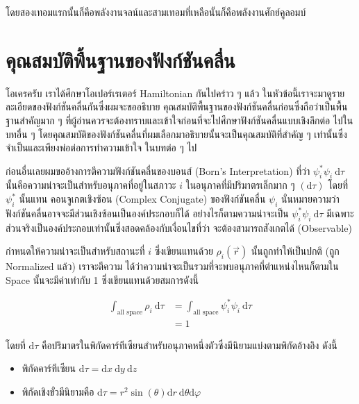 \noindent โดยสองเทอมแรกนั้นก็คือพลังงานจลน์และสามเทอมที่เหลือนั้นก็คือพลังงานศักย์คูลอมบ์

\section{คุณสมบัติพื้นฐานของฟังก์ชันคลื่น}

โอเครครับ เราได้ศึกษาโอเปอร์เรเตอร์ Hamiltonian กันไปคร่าว ๆ แล้ว ในหัวข้อนี้เราจะมาดูรายละเอียดของฟังก์ชันคลื่นกันซึ่งผมจะขออธิบาย%
คุณสมบัติพื้นฐานของฟังก์ชันคลื่นก่อนซึ่งถือว่าเป็นพื้นฐานสำคัญมาก ๆ ที่ผู้อ่านควรจะต้องทราบและเข้าใจก่อนที่จะไปศึกษาฟังก์ชันคลื่นแบบเชิงลึกต่อ%
ไปในบทอื่น ๆ โดยคุณสมบัติของฟังก์ชันคลื่นที่ผมเลือกมาอธิบายนั้นจะเป็นคุณสมบัติที่สำคัญ ๆ เท่านั้นซึ่งจำเป็นและเพียงพ่อต่อการทำความเข้าใจ%
ในบทต่อ ๆ ไป

ก่อนอื่นเลยผมขออ้างการตีความฟังก์ชันคลื่นของบอนส์ (Born's Interpretation) ที่ว่า $\psi_i^* \psi_i \mathrm{~d} \tau$
นั้นคือความน่าจะเป็นสำหรับอนุภาคที่อยู่ในสภาวะ $i$ ในอนุภาคที่มีปริมาตรเล็กมาก ๆ $(\mathrm{d} \tau)$ โดยที่ $\psi_i^*$ นั้นแทน%
คอนจูเกตเชิงซ้อน (Complex Conjugate) ของฟังก์ชันคลื่น $\psi_i$ นั่นหมายความว่าฟังก์ชันคลื่นอาจจะมีส่วนเชิงซ้อนเป็นองค์ประกอบก็ได้
อย่างไรก็ตามความน่าจะเป็น $\psi_i^* \psi_i \mathrm{~d} \tau$ มีเฉพาะส่วนจริงเป็นองค์ประกอบเท่านั้นซึ่งสอดคล้องกับเงื่อนไขที่ว่า%
จะต้องสามารถสังเกตได้ (Observable)

กำหนดให้ความน่าจะเป็นสำหรับสถานะที่ $i$ ซึ่งเขียนแทนด้วย $\rho_i(\vec{r})$ นั้นถูกทำให้เป็นปกติ (ถูก Normalized แล้ว) เราจะตีความ%
ได้ว่าความน่าจะเป็นรวมที่จะพบอนุภาคที่ตำแหน่งไหนก็ตามใน Space นั้นจะมีค่าเท่ากับ 1 ซึ่งเขียนแทนด้วยสมการดังนี้

\begin{equation}
  \begin{aligned}
    \int_{\text{all space}} \rho_i \mathrm{~d} \tau
     & = \int_{\text{all space}} \psi_i^* \psi_i \mathrm{~d} \tau \\
     & = 1
  \end{aligned}
\end{equation}

\noindent โดยที่ $\mathrm{d} \tau$ คือปริมาตรในพิกัดคาร์ทีเซียนสำหรับอนุภาคหนึ่งตัวซึ่งมีนิยามแบ่งตามพิกัดอ้างอิง ดังนี้

\begin{itemize}[topsep=0pt,noitemsep]
  \setlength\itemsep{1em}
  \item พิกัดคาร์ทีเซียน $\mathrm{d} \tau = \mathrm{d} x \mathrm{~d} y \mathrm{~d} z$

  \item พิกัดเชิงขั่วมีนิยามคือ $\mathrm{d} \tau = r^2 \sin (\theta) \mathrm{d} r \mathrm{~d} \theta \mathrm{d} \varphi$
\end{itemize}

